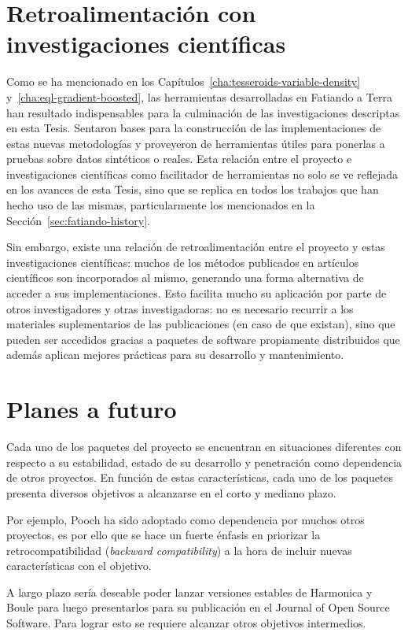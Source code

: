 \section{Retroalimentación con investigaciones científicas}

Como se ha mencionado en los Capítulos~\ref{cha:tesseroids-variable-density}
y~\ref{cha:eql-gradient-boosted}, las herramientas desarrolladas en Fatiando
a Terra han resultado indispensables para la culminación de las investigaciones
descriptas en esta Tesis.
Sentaron bases para la construcción de las implementaciones de estas nuevas
metodologías y proveyeron de herramientas útiles para ponerlas a pruebas
sobre datos sintéticos o reales.
Esta relación entre el proyecto e investigaciones científicas como facilitador
de herramientas no solo se ve reflejada en los avances de esta Tesis, sino que
se replica en todos los trabajos que han hecho uso de las mismas,
particularmente los mencionados en la Sección~\ref{sec:fatiando-history}.

Sin embargo, existe una relación de retroalimentación entre el proyecto y estas
investigaciones científicas: muchos de los métodos publicados en artículos
científicos son incorporados al mismo, generando una forma alternativa de
acceder a sus implementaciones.
Esto facilita mucho su aplicación por parte de otros investigadores y otras
investigadoras: no es necesario recurrir a los materiales suplementarios de las
publicaciones (en caso de que existan), sino que pueden ser accedidos gracias
a paquetes de software propiamente distribuidos que además aplican mejores
prácticas para su desarrollo y mantenimiento.


\section{Planes a futuro}

Cada uno de los paquetes del proyecto se encuentran en situaciones diferentes
con respecto a su estabilidad, estado de su desarrollo y penetración como
dependencia de otros proyectos.
En función de estas características, cada uno de los paquetes presenta diversos
objetivos a alcanzarse en el corto y mediano plazo.

Por ejemplo, Pooch ha sido adoptado como dependencia por muchos otros
proyectos, es por ello que se hace un fuerte énfasis en priorizar la
retrocompatibilidad (\emph{backward compatibility}) a la hora de incluir nuevas
características con el objetivo.

A largo plazo sería deseable poder lanzar versiones estables de Harmonica
y Boule para luego presentarlos para su publicación en el Journal of Open
Source Software.
Para lograr esto se requiere alcanzar otros objetivos intermedios.


